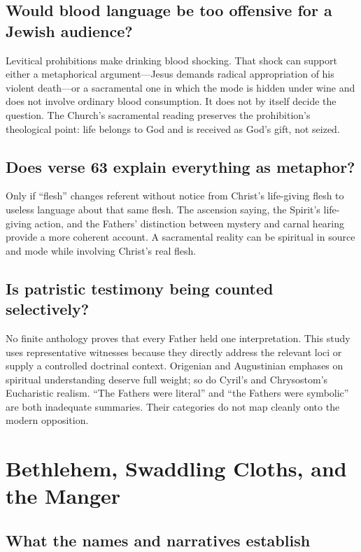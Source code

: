 \begin{deepstudy}
\subsection{Would blood language be too offensive for a Jewish audience?}

Levitical prohibitions make drinking blood shocking. That shock can support
either a metaphorical argument---Jesus demands radical appropriation of his
violent death---or a sacramental one in which the mode is hidden under wine and
does not involve ordinary blood consumption. It does not by itself decide the
question. The Church's sacramental reading preserves the prohibition's
theological point: life belongs to God and is received as God's gift, not
seized.

\subsection{Does verse 63 explain everything as metaphor?}

Only if ``flesh'' changes referent without notice from Christ's life-giving
flesh to useless language about that same flesh. The ascension saying, the
Spirit's life-giving action, and the Fathers' distinction between mystery and
carnal hearing provide a more coherent account. A sacramental reality can be
spiritual in source and mode while involving Christ's real flesh.

\subsection{Is patristic testimony being counted selectively?}

No finite anthology proves that every Father held one interpretation. This
study uses representative witnesses because they directly address the relevant
loci or supply a controlled doctrinal context. Origenian and Augustinian
emphases on spiritual understanding deserve full weight; so do Cyril's and
Chrysostom's Eucharistic realism. ``The Fathers were literal'' and ``the
Fathers were symbolic'' are both inadequate summaries. Their categories do not
map cleanly onto the modern opposition.

\section{Bethlehem, Swaddling Cloths, and the Manger}

\subsection{What the names and narratives establish}


\end{deepstudy}
